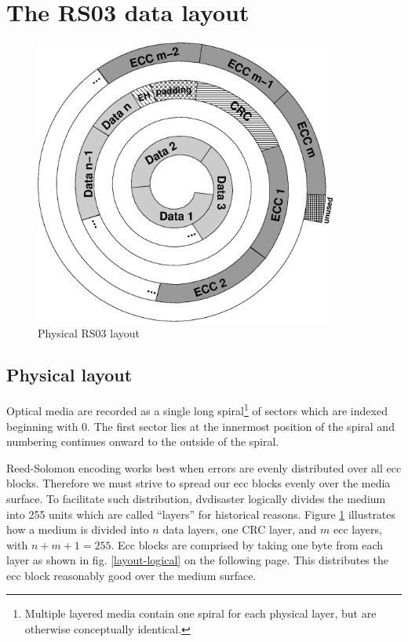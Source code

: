 \section{The RS03 data layout}

\begin{figure}
 \begin{center}
 \includegraphics[width=10cm]{spiral.eps}
 \caption{Physical RS03 layout}
 \label{layout-phy}
 \end{center}
\end{figure}

\subsection{Physical layout}

Optical media are recorded as a single long spiral\footnote{Multiple layered
media contain one spiral for each physical layer, but are otherwise conceptually
identical.} of sectors which are indexed beginning with 0. 
The first sector lies at the innermost position of the spiral and 
numbering continues onward to the outside of the spiral.

Reed-Solomon encoding works best when errors are evenly distributed over
all ecc blocks. Therefore we must strive to spread our ecc blocks evenly over
the media surface. To facilitate such distribution, dvdisaster logically
divides the medium into 255 units which are called ``layers'' for historical reasons.
Figure \ref{layout-phy} illustrates how a medium is divided into $n$ data layers,
one CRC layer, and $m$ ecc layers, with $n+m+1 = 255$. Ecc blocks are comprised
by taking one byte from each layer as shown in fig. \ref{layout-logical} on 
the following page.
This distributes the ecc block reasonably good 
over the medium surface.

